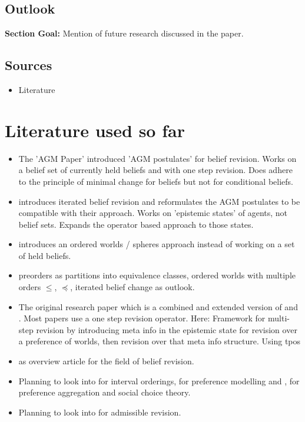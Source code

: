 \documentclass[11pt]{article}
\begin{document}
\subsection{Outlook}
\textbf{Section Goal:} Mention of future research discussed in the paper.

\subsection{Sources}
\begin{itemize}
    \item Literature
\end{itemize}

\section{Literature used so far}
\begin{itemize}
    \item The 'AGM Paper' \cite{Alchourron1985} introduced 'AGM postulates' for belief revision. Works on a belief set of currently held beliefs and with one step revision. Does adhere to the \gls{principle of minimal change} for beliefs but not for conditional beliefs.
    \item \cite{Darwiche1997} introduces iterated belief revision and reformulates the AGM postulates to be compatible with their approach. Works on 'epistemic states' of agents, not belief sets. Expands the operator based approach to those states.
    \item \cite{Grove1988} introduces an ordered worlds / spheres approach instead of working on a set of held beliefs.
    \item \cite{Booth2004} preorders as partitions into equivalence classes, ordered worlds with multiple orders $\leq$, $\preceq$, iterated belief change as outlook.
    \item The original research paper \cite{Booth2011} which is a combined and extended version of \cite{Booth2006} and \cite{Booth2007}. Most papers use a one step revision operator. Here: Framework for multi-step revision by introducing meta info in the epistemic state for revision over a preference of worlds, then revision over that meta info structure. Using \gls{tpos}
    \item \cite{Ferme2011} as overview article for the field of belief revision.
    \item Planning to look into \cite{Allen1983} for interval orderings, \cite{Oeztuerk2005} for preference modelling and \cite{Arrow1963}, \cite{Glaister1998} for preference aggregation and social choice theory.
    \item Planning to look into \cite{Booth2006a} for admissible revision.
\end{itemize}
\end{document}
